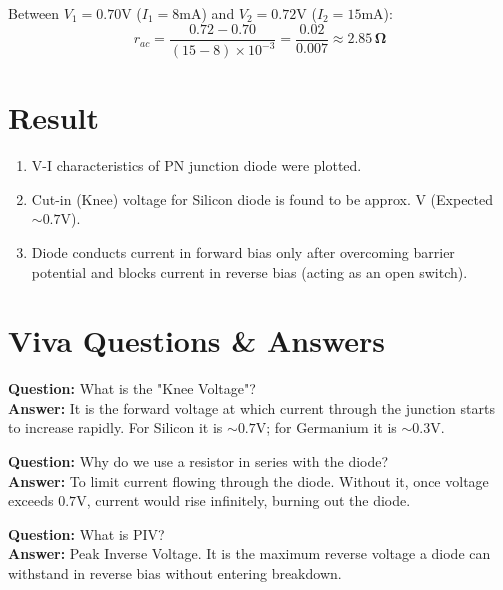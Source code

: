 \begin{example}
Between $V_1 = 0.70\text{V}$ ($I_1 = 8\text{mA}$) and $V_2 = 0.72\text{V}$ ($I_2 = 15\text{mA}$):
\begin{equation*}
    r_{ac} = \frac{0.72 - 0.70}{(15 - 8) \times 10^{-3}} = \frac{0.02}{0.007} \approx \mathbf{2.85\,\Omega}
\end{equation*}
\end{example}

\section{Result}
\begin{enumerate}
    \item V-I characteristics of PN junction diode were plotted.
    \item Cut-in (Knee) voltage for Silicon diode is found to be approx. \underline{\hspace{1cm}} V (Expected $\sim 0.7\text{V}$).
    \item Diode conducts current in forward bias only after overcoming barrier potential and blocks current in reverse bias (acting as an open switch).
\end{enumerate}

\section{Viva Questions \& Answers}

\begin{vivaqa}
\textbf{Question:} What is the "Knee Voltage"?\\[4pt]
\textbf{Answer:} It is the forward voltage at which current through the junction starts to increase rapidly. For Silicon it is $\sim 0.7\text{V}$; for Germanium it is $\sim 0.3\text{V}$.
\end{vivaqa}

\begin{vivaqa}
\textbf{Question:} Why do we use a resistor in series with the diode?\\[4pt]
\textbf{Answer:} To limit current flowing through the diode. Without it, once voltage exceeds $0.7\text{V}$, current would rise infinitely, burning out the diode.
\end{vivaqa}

\begin{vivaqa}
\textbf{Question:} What is PIV?\\[4pt]
\textbf{Answer:} Peak Inverse Voltage. It is the maximum reverse voltage a diode can withstand in reverse bias without entering breakdown.
\end{vivaqa}

